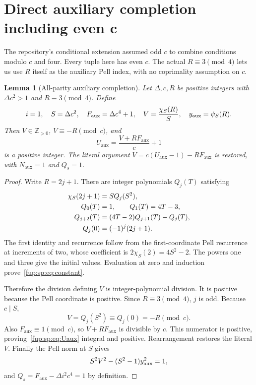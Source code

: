 \documentclass[11pt,letterpaper]{article}
\newtheorem{lemma}[theorem]{Lemma}
\theoremstyle{definition}\newtheorem{definition}[theorem]{Definition}
\theoremstyle{remark}\newtheorem{remark}[theorem]{Remark}
\newcommand{\pos}{\mathbb Z_{>0}}
\newcommand{\D}{\Delta}
\newcommand{\ch}[2]{\chi_{#1}(#2)}\newcommand{\ps}[2]{\psi_{#1}(#2)}
\newcommand{\Na}{N_{\mathrm{aux}}}\newcommand{\Nk}{N_{\mathrm{index}}}\newcommand{\Nt}{N_{\mathrm{transport}}}
\newcommand{\Fa}{F_{\mathrm{aux}}}\newcommand{\Ua}{U_{\mathrm{aux}}}\newcommand{\ttt}{t_{\mathrm{tr}}}
\begin{document}
\section{Direct auxiliary completion including even c}
\label{fup:sp:sec:aux}
The repository's conditional extension assumed odd $c$ to combine
conditions modulo $c$ and four. Every tuple here has even $c$.
The actual $R\equiv3\pmod4$ lets us use $R$ itself as the auxiliary
Pell index, with no coprimality assumption on $c$.

\begin{lemma}[All-parity auxiliary completion]
\label{fup:sp:lem:aux}
Let $\D,c,R$ be positive integers with $\D c^2>1$ and
$R\equiv3\pmod4$. Define
\begin{equation}
i=1,\quad S=\D c^2,\quad \Fa=\D c^4+1,\quad
V=\frac{\ch S R}{S},\quad \yaux=\ps S R.
\label{fup:sp:eq:auxchoices}
\end{equation}
Then $V\in\pos$, $V\equiv-R\pmod c$, and
\begin{equation}
\Ua=\frac{V+R\Fa}{c}+1
\label{fup:sp:eq:Uaux}
\end{equation}
is a positive integer. The literal argument $V=c(\Ua-1)-R\Fa$
is restored, with $\Na=1$ and $Q_s=1$.
\end{lemma}
\begin{proof}
Write $R=2j+1$. There are integer polynomials $Q_j(T)$ satisfying
\begin{align}
\ch S{2j+1}&=S Q_j(S^2),\label{fup:sp:eq:oddpoly}\\
Q_0(T)&=1,\qquad Q_1(T)=4T-3,\notag\\
Q_{j+2}(T)&=(4T-2)Q_{j+1}(T)-Q_j(T),\notag\\
Q_j(0)&=(-1)^j(2j+1).\label{fup:sp:eq:constant}
\end{align}
The first identity and recurrence follow from the first-coordinate
Pell recurrence at increments of two, whose coefficient is
$2\ch S2=4S^2-2$. The powers one and three give the initial
values. Evaluation at zero and induction prove~\eqref{fup:sp:eq:constant}.

Therefore the division defining $V$ is integer-polynomial division.
It is positive because the Pell coordinate is positive.
Since $R\equiv3\pmod4$, $j$ is odd. Because $c\mid S$,
\[
V=Q_j(S^2)\equiv Q_j(0)=-R\pmod c.
\]
Also $\Fa\equiv1\pmod c$, so $V+R\Fa$ is divisible by $c$.
This numerator is positive, proving~\eqref{fup:sp:eq:Uaux} integral and
positive. Rearrangement restores the literal $V$.
Finally the Pell norm at $S$ gives
\[
S^2V^2-(S^2-1)y_{\mathrm{aux}}^2=1,
\]
and $Q_s=\Fa-\D i^2c^4=1$ by definition.
\end{proof}
\end{document}
